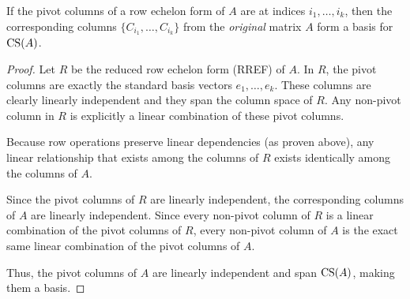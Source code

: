 \documentclass[../linear_algebra_and_groups.tex]{subfiles}
\begin{document}
\begin{theorem}
    \begin{shaded*}
        If the pivot columns of a row echelon form of $A$ are at indices $i_1,\dots,i_k$, then the corresponding columns $\{C_{i_1},\dots,C_{i_k}\}$ from the \textit{original} matrix $A$ form a basis for $\operatorname{CS}(A)$.
    \end{shaded*}
\end{theorem}
\begin{proof}
    Let $R$ be the reduced row echelon form (RREF) of $A$. In $R$, the pivot columns are exactly the standard basis vectors $e_1, \dots, e_k$. These columns are clearly linearly independent and they span the column space of $R$. Any non-pivot column in $R$ is explicitly a linear combination of these pivot columns.
    
    Because row operations preserve linear dependencies (as proven above), any linear relationship that exists among the columns of $R$ exists identically among the columns of $A$. 
    
    Since the pivot columns of $R$ are linearly independent, the corresponding columns of $A$ are linearly independent. Since every non-pivot column of $R$ is a linear combination of the pivot columns of $R$, every non-pivot column of $A$ is the exact same linear combination of the pivot columns of $A$. 
    
    Thus, the pivot columns of $A$ are linearly independent and span $\operatorname{CS}(A)$, making them a basis.
    \qedhere
\end{proof}
\end{document}
